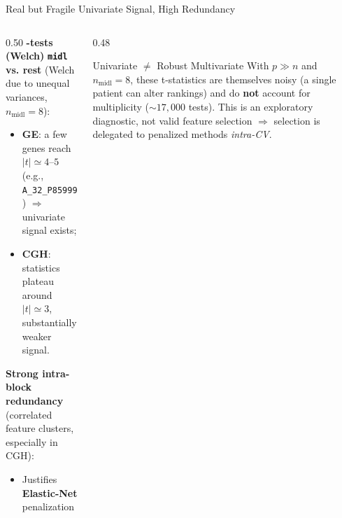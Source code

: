 \documentclass[aspectratio=169, 10pt]{beamer}
\begin{document}
\begin{frame}{Real but Fragile Univariate Signal, High Redundancy}
  \begin{columns}[T]
    \begin{column}{0.50\textwidth}
      \textbf{-tests (Welch)} \texttt{\textbf{midl}} \textbf{vs. rest} (Welch due to unequal variances, $n_{\text{midl}} = 8$):
      \begin{itemize}
        \item \textbf{GE}: a few genes reach $|t| \simeq 4$–$5$ (e.g., \texttt{A\_32\_P85999}) $\Rightarrow$ univariate signal exists;
        \item \textbf{CGH}: statistics plateau around $|t| \simeq 3$, substantially weaker signal.
      \end{itemize}
      \bigskip
      \textbf{Strong intra-block redundancy} (correlated feature clusters, especially in CGH):
      \begin{itemize}
        \item Justifies \textbf{Elastic-Net} penalization
      \end{itemize}
    \end{column}

    \begin{column}{0.48\textwidth}
      \begin{exampleblock}{Univariate $\neq$ Robust Multivariate}
        With $p \gg n$ and $n_{\text{midl}} = 8$, these t-statistics are themselves noisy (a single patient can alter rankings) and do \textbf{not} account for multiplicity ($\sim 17{,}000$ tests). This is an exploratory diagnostic, not valid feature selection $\Rightarrow$ selection is delegated to penalized methods \textit{intra-CV}.
      \end{exampleblock}
    \end{column}
  \end{columns}
\end{frame}
\end{document}
